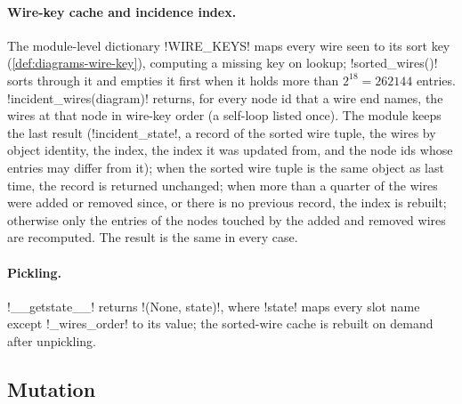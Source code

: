 \paragraph{Wire-key cache and incidence index.} The module-level dictionary \py!WIRE_KEYS! maps every wire seen to its sort key (\cref{def:diagrams-wire-key}), computing a missing key on lookup; \py!sorted_wires()! sorts through it and empties it first when it holds more than $2^{18}=262144$ entries. \py!incident_wires(diagram)! returns, for every node id that a wire end names, the wires at that node in wire-key order (a self-loop listed once). The module keeps the last result (\py!incident_state!, a record of the sorted wire tuple, the wires by object identity, the index, the index it was updated from, and the node ids whose entries may differ from it); when the sorted wire tuple is the same object as last time, the record is returned unchanged; when more than a quarter of the wires were added or removed since, or there is no previous record, the index is rebuilt; otherwise only the entries of the nodes touched by the added and removed wires are recomputed. The result is the same in every case.

\paragraph{Pickling.} \py!__getstate__! returns \py!(None, state)!, where \py!state! maps every slot name except \py!_wires_order! to its value; the sorted-wire cache is rebuilt on demand after unpickling.

\subsection{Mutation}

